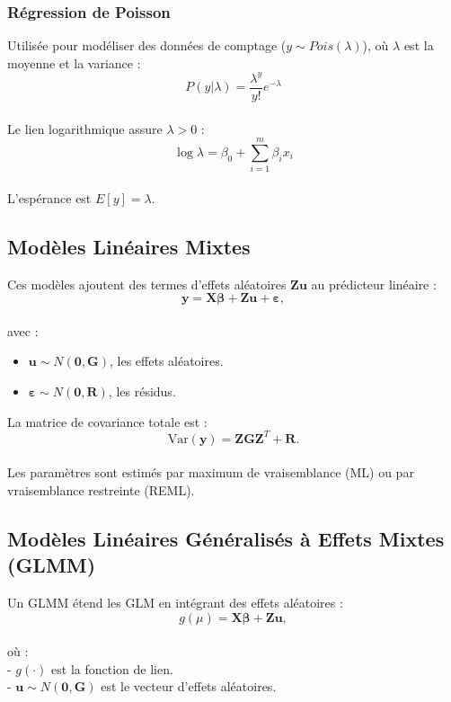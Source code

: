 \documentclass[
]{article}
\begin{document}
\subsubsection{Régression de Poisson}\label{ruxe9gression-de-poisson}

Utilisée pour modéliser des données de comptage
(\(y \sim Pois(\lambda)\)), où \(\lambda\) est la moyenne et la variance
:\\
\[ P(y | \lambda) = \frac{\lambda^y}{y!} e^{-\lambda} \]\\
Le lien logarithmique assure \(\lambda > 0\) :\\
\[ \log{\lambda} = \beta_0 + \sum_{i=1}^m \beta_i x_i \]\\
L'espérance est \(E[y] = \lambda\).

\subsection{Modèles Linéaires
Mixtes}\label{moduxe8les-linuxe9aires-mixtes}

Ces modèles ajoutent des termes d'effets aléatoires
\(\mathbf{Z} \mathbf{u}\) au prédicteur linéaire :\\
\[ \mathbf{y} = \mathbf{X} \boldsymbol{\beta} + \mathbf{Z} \mathbf{u} + \boldsymbol{\varepsilon}, \]\\
avec :

\begin{itemize}
\item
  \(\mathbf{u} \sim N(\mathbf{0}, \mathbf{G})\), les effets aléatoires.
\item
  \(\boldsymbol{\varepsilon} \sim N(\mathbf{0}, \mathbf{R})\), les
  résidus.
\end{itemize}

La matrice de covariance totale est :\\
\[ \mathrm{Var}(\mathbf{y}) = \mathbf{Z} \mathbf{G} \mathbf{Z}^T + \mathbf{R}. \]\\
Les paramètres sont estimés par maximum de vraisemblance (ML) ou par
vraisemblance restreinte (REML).

\subsection{Modèles Linéaires Généralisés à Effets Mixtes
(GLMM)}\label{moduxe8les-linuxe9aires-guxe9nuxe9ralisuxe9s-uxe0-effets-mixtes-glmm}

Un GLMM étend les GLM en intégrant des effets aléatoires :\\
\[ g(\mu) = \mathbf{X} \boldsymbol{\beta} + \mathbf{Z} \mathbf{u}, \]\\
où :\\
- \(g(\cdot)\) est la fonction de lien.\\
- \(\mathbf{u} \sim N(\mathbf{0}, \mathbf{G})\) est le vecteur d'effets
aléatoires.
\end{document}
